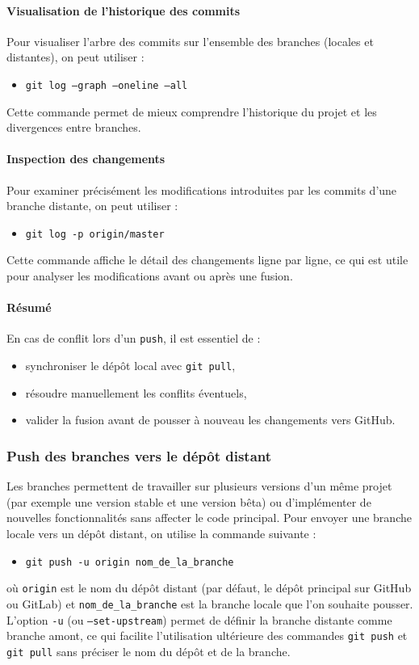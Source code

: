 \documentclass{article}
\begin{document}
\paragraph{Visualisation de l’historique des commits}
Pour visualiser l’arbre des commits sur l’ensemble des branches (locales et distantes), on peut utiliser :
\begin{itemize}
    \item \texttt{git log --graph --oneline --all}
\end{itemize}
Cette commande permet de mieux comprendre l’historique du projet et les divergences entre branches.

\paragraph{Inspection des changements}
Pour examiner précisément les modifications introduites par les commits d’une branche distante, on peut utiliser :
\begin{itemize}
    \item \texttt{git log -p origin/master}
\end{itemize}
Cette commande affiche le détail des changements ligne par ligne, ce qui est utile pour analyser les modifications avant ou après une fusion.

\paragraph{Résumé}
En cas de conflit lors d’un \texttt{push}, il est essentiel de :
\begin{itemize}
    \item synchroniser le dépôt local avec \texttt{git pull},
    \item résoudre manuellement les conflits éventuels,
    \item valider la fusion avant de pousser à nouveau les changements vers GitHub.
\end{itemize}

\subsubsection{Push des branches vers le dépôt distant}

Les branches permettent de travailler sur plusieurs versions d’un même projet (par exemple une version stable et une version bêta) ou d’implémenter de nouvelles fonctionnalités sans affecter le code principal.
Pour envoyer une branche locale vers un dépôt distant, on utilise la commande suivante :
\begin{itemize}
    \item \texttt{git push -u origin nom\_de\_la\_branche}
\end{itemize}
où \texttt{origin} est le nom du dépôt distant (par défaut, le dépôt principal sur GitHub ou GitLab) et \texttt{nom\_de\_la\_branche} est la branche locale que l’on souhaite pousser.
L’option \texttt{-u} (ou \texttt{--set-upstream}) permet de définir la branche distante comme branche amont, ce qui facilite l’utilisation ultérieure des commandes \texttt{git push} et \texttt{git pull} sans préciser le nom du dépôt et de la branche.
\end{document}
